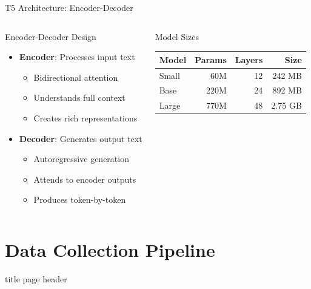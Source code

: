 \documentclass[aspectratio=169]{beamer}
\begin{document}
\begin{frame}{T5 Architecture: Encoder-Decoder}
\begin{columns}[t]
\begin{block}{Encoder-Decoder Design}
\begin{itemize}
  \item \textbf{Encoder}: Processes input text
  \begin{itemize}
    \item Bidirectional attention
    \item Understands full context
    \item Creates rich representations
  \end{itemize}
  \item \textbf{Decoder}: Generates output text
  \begin{itemize}
    \item Autoregressive generation
    \item Attends to encoder outputs
    \item Produces token-by-token
  \end{itemize}
\end{itemize}
\end{block}

\begin{block}{Model Sizes}
\centering
\vspace{0.5cm}
\begin{tabular}{lrrr}
\hline
\textbf{Model} & \textbf{Params} & \textbf{Layers} & \textbf{Size} \\ \hline
Small & 60M  & 12 & 242 MB \\
Base  & 220M & 24 & 892 MB \\
Large & 770M & 48 & 2.75 GB \\ \hline
\end{tabular}
\end{block}
\vfill
\end{columns}
\end{frame}

\section{Data Collection Pipeline}
{
\begin{frame}[plain]
  \vfill
  \centering
  \begin{beamercolorbox}[sep=8pt,center]{title page header}
    \insertsection\par
  \end{beamercolorbox}
  \vfill
\end{frame}
}
\end{document}
